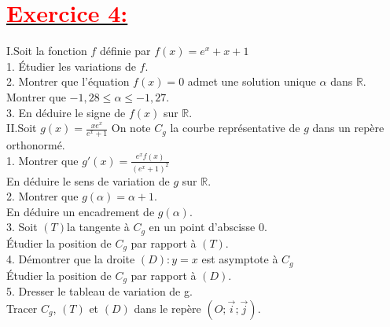 \documentclass[12pt]{article}
\begin{document}
\section*{\underline{\textbf{\textcolor{red}{Exercice 4: }}}}
I.Soit la fonction $f$ définie par $f(x)=e^{x}+x+1$\\
1. Étudier les variations de $f$.\\
2. Montrer que l’équation $f (x) = 0$ admet une solution unique $\alpha$ dans $\mathbb{R}$.\\
Montrer que $-1,28 \leq \alpha \leq -1,27.$\\
3. En déduire le signe de $f (x)$ sur $\mathbb{R}$.\\
II.Soit $g(x)=\frac{xe^{x}}{e^{x}+1}$ On note $C_{g}$ la courbe représentative de $g$ dans un repère orthonormé.\\
1. Montrer que $g'(x)=\frac{e^{x}f(x)}{(e^{x}+1)^{2}}$\\
En déduire le sens de variation de $g$ sur $\mathbb{R}$.\\
2. Montrer que $g(\alpha) = \alpha + 1$.\\
En déduire un encadrement de $g(\alpha)$.\\
3. Soit $(T)$la tangente à $C_{g}$ en un point d’abscisse $0$.\\
Étudier la position de $C_{g}$ par rapport à $(T)$.\\
4. Démontrer que la droite $(D) : y = x$ est asymptote à $C_{g}$\\
Étudier la position de $C_{g}$ par rapport à $(D)$.\\
5. Dresser le tableau de variation de g.\\
Tracer $C_{g}$, $(T)$ et $(D)$ dans le repère $(O;\vec{i};\vec{j})$.
\end{document}
